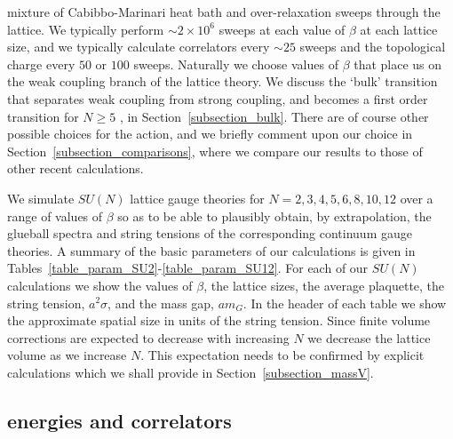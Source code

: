 \documentclass[12pt]{article}
\begin{document}
mixture of Cabibbo-Marinari heat bath and over-relaxation sweeps through the lattice.
We typically perform $\sim 2\times 10^6$ sweeps at each value of $\beta$ at each lattice size,
and we typically calculate correlators every $\sim 25$ sweeps and the topological charge
every $50$ or $100$ sweeps. Naturally we choose values of $\beta$ that place us on the
weak coupling branch of the lattice theory. We discuss the `bulk' transition that separates weak
coupling from strong coupling, and becomes a first order transition for $N\geq 5$
%
\cite{BLMTUW05},
%
in Section~\ref{subsection_bulk}. There are of course other possible choices for the action,
and we briefly comment upon our choice in Section~\ref{subsection_comparisons}, where
we compare our results to those of other recent calculations.


We simulate $SU(N)$ lattice gauge theories for $N=2,3,4,5,6,8,10,12$ over a range of values
of $\beta$ so as to be able to plausibly obtain, by extrapolation, the glueball spectra and
string tensions of the corresponding continuum gauge theories. A summary of the basic
parameters of our calculations is given in Tables~\ref{table_param_SU2}-\ref{table_param_SU12}.
For each of our $SU(N)$ calculations we show the values of $\beta$, the lattice sizes, the
average plaquette, the string tension, $a^2\sigma$, and the mass gap, $am_G$. In the header of
each table we show the approximate spatial size in units of the string tension. Since
finite volume corrections are expected to decrease with increasing $N$ we decrease the
lattice volume as we increase $N$. This expectation needs to be confirmed by explicit
calculations which we shall provide in Section~\ref{subsection_massV}.


%
%
\subsection{energies and correlators}
\label{subsection_lattice_energies}
\end{document}
